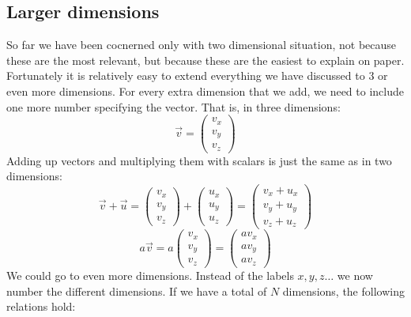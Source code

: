 \documentclass[a4paper]{report}
\begin{document}
\subsection{Larger dimensions}
So far we have been cocnerned only with two dimensional situation, not because these are the most relevant, but because these are the easiest to explain on paper. Fortunately it is relatively easy to extend everything we have discussed to 3 or even more dimensions. For every extra dimension that we add, we need to include one more number specifying the vector. That is, in three dimensions:
\begin{equation}
\vec{v} = \begin{pmatrix}
v_x \\
v_y \\
v_z
\end{pmatrix}
\end{equation}
Adding up vectors and multiplying them with scalars is just the same as in two dimensions:
\begin{equation}
\vec{v} + \vec{u} = \begin{pmatrix}
v_x \\
v_y \\
v_z
\end{pmatrix}
+
\begin{pmatrix}
u_x \\
u_y \\
u_z
\end{pmatrix}
=
\begin{pmatrix}
v_x + u_x \\
v_y + u_y\\
v_z + u_z
\end{pmatrix}
\end{equation}
\begin{equation}
a\vec{v} = a\begin{pmatrix} v_x \\ v_y \\ v_z \end{pmatrix} = \begin{pmatrix} a v_x \\ a v_y \\ a v_z \end{pmatrix}
\end{equation}
We could go to even more dimensions. Instead of the labels $x,y,z\dots$ we now number the different dimensions. If we have a total of $N$ dimensions, the following relations hold:
\end{document}
